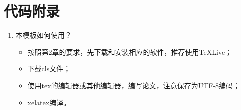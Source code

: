 \chapter{代码附录}
\label{appendix-code}

\begin{enumerate}
	\item 本模板如何使用？
	\label{code-howtouse}
	\begin{itemize}
		\item 按照第2章的要求，先下载和安装相应的软件，推荐使用\TeX{}Live；
		\item 下载cls文件；
		\item 使用tex的编辑器或其他编辑器，编写论文，注意保存为UTF-8编码；
		\item xelatex编译。
	\end{itemize}
\end{enumerate}


